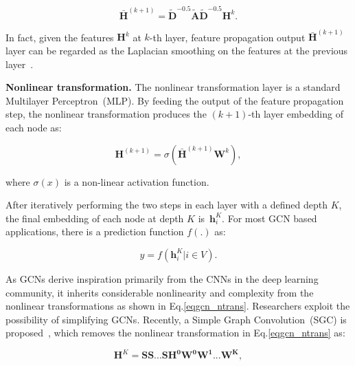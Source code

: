 \documentclass[letterpaper]{article} %
\newcommand{\Mat}[1]{\mathbf{#1}}
\begin{document}
\begin{small}
\begin{equation}\label{eq:gcn_fpw_matrix}
\bar{\Mat{H}}^{(k+1)}=\Mat{\tilde{D}}^{-0.5}\Mat{\tilde{A}}\Mat{\tilde{D}}^{-0.5}\Mat{H}^k.
\end{equation}
\end{small}

In fact, given the features $\Mat{H}^k$ at $k$-th layer, feature propagation output $\bar{\Mat{H}}^{(k+1)}$
layer can be regarded as the Laplacian smoothing on the features at the previous layer~\cite{li2018deeper,zhu2003semi}.


\textbf{Nonlinear transformation.} The nonlinear transformation layer is a standard Multilayer Perceptron~(MLP). By feeding the output of the feature propagation step, the nonlinear transformation produces the $(k+1)$-th layer embedding of each node as:

\begin{small}
\begin{equation} \label{eqgcn_ntrans}
\mathbf{H}^{(k+1)}=\sigma(\bar{\Mat{H}}^{(k+1)}\mathbf{W}^k),
\end{equation}
\end{small}

\noindent where $\sigma(x)$ is a non-linear activation function.


After iteratively performing the two steps in each layer with a defined depth $K$, the final embedding of each node at depth $K$ is~{\footnotesize $\mathbf{h}^K_i$}. For most GCN based applications, there is a prediction function $f(.)$ as:

\begin{small}
\begin{equation}
\hat{y}= f({\mathbf{h}^K_i|i\in V}).
\end{equation}
\end{small}


As GCNs derive inspiration primarily from the CNNs in the deep learning community, it inherits considerable nonlinearity and complexity from the nonlinear transformations as shown in Eq.\eqref{eqgcn_ntrans}. Researchers exploit the possibility of simplifying
GCNs. Recently, a Simple Graph Convolution~(SGC) is proposed~\cite{ICML2019simplifying}, which removes the nonlinear transformation in Eq.\eqref{eqgcn_ntrans} as:

\begin{small}
\begin{equation} \label{eqsgcn_1}
\mathbf{H}^{K}=\mathbf{\mathbf{S}\mathbf{S}...\mathbf{S}\mathbf{H^0}\Mat{W}^0\Mat{W}^1...\Mat{W}^K},
\end{equation}
\end{small}
\end{document}

